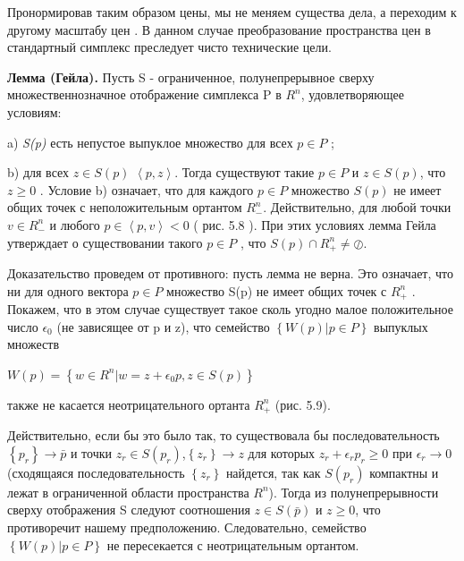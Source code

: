 \documentclass[12pt, 4paper]{book}
\begin{document}
{Пронормировав таким образом цены, мы не меняем существа дела, а переходим к другому масштабу цен . В данном случае преобразование пространства цен в стандартный симплекс преследует чисто технические цели.
\par

\textbf{Лемма (Гейла).} Пусть S - ограниченное, полунепрерывное сверху множественнозначное отображение симплекса P в $R^n$, удовлетворяющее условиям: 
\par

a) \textit{S(p)} есть непустое выпуклое множество для всех $p \in P$ ;
\par

b) для всех $z \in S(p)$ $\left\langle p,z \right\rangle$. Тогда существуют такие $p \in P$ и $z \in S(p)$, что $z \geq 0$ .
Условие b) означает, что для каждого $p \in P$ множество $S(p)$ не имеет общих точек с неположительным ортантом $R_{-}^{n}$. Действительно, для любой точки $v \in R_{-}^{n}$ и любого $p \in \left\langle p,v \right\rangle < 0$ ( рис. 5.8 ). При этих условиях лемма Гейла утверждает о существовании такого $p \in P$ , что $S(p) \cap R_{+}^{n} \neq \oslash$.
\par

Доказательство проведем от противного: пусть лемма не верна. Это означает, что ни для одного вектора $p \in P$ множество S(p) не имеет общих точек с $R_{+}^{n}$ . Покажем, что в этом случае существует такое сколь угодно малое положительное число $\epsilon_0$ (не зависящее от p и z), что семейство $\left\{W(p)|p \in P\right\}$ выпуклых множеств
\begin{center}
$W(p)=\left\{ w \in R^{n} | w=z+\epsilon_0 p, z \in S(p)\right\}$
\end{center}
\par

также не касается неотрицательного ортанта $R_{+}^{n}$ (рис. 5.9).
\par

Действительно, если бы это было так, то существовала бы последовательность $\left\{ p_r\right\} \rightarrow \bar{p}$ и точки $z_r \in S(p_r)$,$ \left\{z_r \right\}\rightarrow z$ для которых $z_r + \epsilon_r p_r \geq 0$ при $\epsilon_r \rightarrow 0$ (сходящаяся последовательность $\left\{ z_r \right\}$ найдется, так как $S(p_r)$ компактны и лежат в ограниченной области пространства $R^n$). Тогда из полунепрерывности сверху отображения S следуют соотношения $z \in S(\bar{p})$ и $z \geq 0$, что противоречит нашему предположению. Следовательно, семейство $\left\{W(p)|p \in P \right\}$ не пересекается с неотрицательным ортантом. 
\par

}
\end{document}
